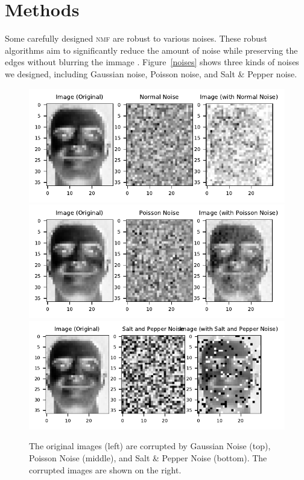 \section{Methods \label{chapter2}}
Some carefully designed \textsc{nmf} are robust to various noises. These robust algorithms aim to significantly reduce the amount of noise while preserving the edges without blurring the immage \citep{barbu2013variational}. Figure~\ref{noises} shows three kinds of noises we designed, including Gaussian noise, Poisson noise, and Salt \& Pepper noise.


\begin{figure}\label{noises}
	\centering
	\includegraphics[scale=.8]{Noise_ORL_Normal_Comparison}\\ %
	\includegraphics[scale=.8]{Noise_ORL_Poisson_Comparison}\\
	\includegraphics[scale=.8]{Noise_ORL_Salt_and_Pepper_Comparison}
	\caption{The original images (left) are corrupted by Gaussian Noise (top), Poisson Noise (middle), and Salt \& Pepper Noise (bottom). The corrupted images are shown on the right.}
	\label{fig:noise}
\end{figure}


